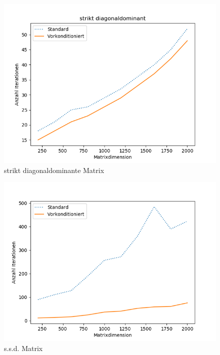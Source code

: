 \begin{figure}
    \centering
    \includegraphics[width=\linewidth]{Aufgabe_1/f_strikt.png}
    \caption{strikt diagonaldominante Matrix}
\end{figure}
\begin{figure}
    \centering
    \includegraphics[width=\linewidth]{Aufgabe_1/f.png}
    \caption{s.s.d. Matrix}
\end{figure}

